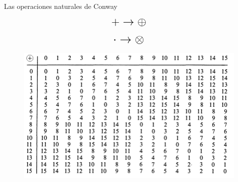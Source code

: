 \documentclass[10pt,spanish]{beamer}
\begin{document}
\begin{frame}{Las operaciones naturales de Conway}



$$\mathlarger{\mathlarger{\mathlarger{+ \rightarrow \oplus}}}$$


$$\mathlarger{\mathlarger{\mathlarger{\cdot \rightarrow \otimes}}}$$







\end{frame}

\begin{frame}
\begin{figure}
	\includegraphics[scale=0.5,left]{nim_addition.png}
\end{figure}
\end{frame}
\end{document}
